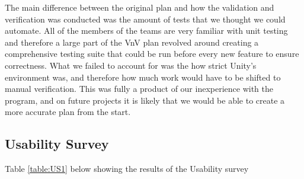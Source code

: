 \documentclass[12pt, titlepage]{article}
\begin{document}
The main difference between the original plan and how the validation and verification was conducted was the amount of tests that we thought we could automate. All of the members of the teams are very familiar with unit testing and therefore a large part of the VnV plan revolved around creating a comprehensive testing suite that could be run before every new feature to ensure correctness. What we failed to account for was the how strict Unity's environment was, and therefore how much work would have to be shifted to manual verification. This was fully a product of our inexperience with the program, and on future projects it is likely that we would be able to create a more accurate plan from the start. 



\subsection{Usability Survey}

Table \ref{table:US1} below showing the results of the Usability survey

\begin{table}[H]
\caption{\bf Results of Usability Survey}
\label{table:US1}
\end{table}
\end{document}

